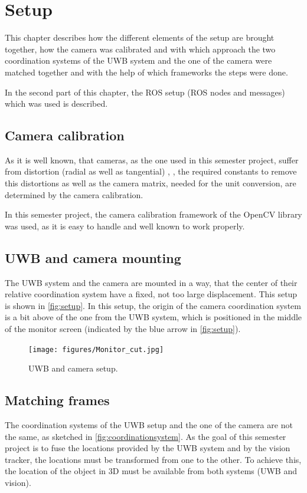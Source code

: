 
\setcounter{chapter}{2}

\chapter{Setup}\label{ch:setup}
This chapter describes how the different elements of the setup are brought together, how  the camera was calibrated and with which approach the two coordination systems of the UWB system and the one of the camera were matched together and with the help of which frameworks the steps were done.

In the second part of this chapter, the ROS setup (ROS nodes and messages) which was used is described. 

\section{Camera calibration}
As it is well known, that cameras, as the one used in this semester project, suffer from distortion (radial as well as tangential) \cite{Szeliski:2010:CVA:1941882}, \cite{opencv_library}, the required constants to remove this distortions as well as the camera matrix, needed for the unit conversion, are determined by the camera calibration.

In this semester project, the camera calibration framework of the OpenCV library \cite{opencv_library} was used, as it is easy to handle and well known to work properly.

\section{UWB and camera mounting}
The UWB system and the camera are mounted in a way, that the center of their relative coordination system have a fixed, not too large displacement. This setup is shown in \autoref{fig:setup}. In this setup, the origin of the camera coordination system is a bit above of the one from the UWB system, which is positioned in the middle of the monitor screen (indicated by the blue arrow in \autoref{fig:setup}). 

\begin{figure}[h]\centering
	\texttt{[image: figures/Monitor\_cut.jpg]}
	\caption{UWB and camera setup.}\label{fig:setup}
\end{figure}

\section{Matching frames}
The coordination systems of the UWB setup and the one of the camera are not the same, as sketched in \autoref{fig:coordinationsystem}. As the goal of this semester project is to fuse the locations provided by the UWB system and by the vision tracker, the locations must be transformed from one to the other. To achieve this, the location of the object in 3D must be available from both systems (UWB and vision).

